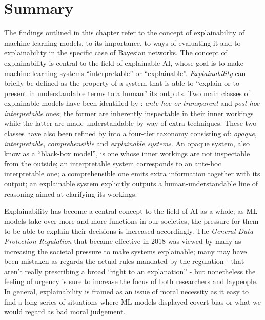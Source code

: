\section{Summary} \label{sec:literature-review-summary}
The findings outlined in this chapter refer to the concept of explainability of machine learning models, to its importance, to ways of evaluating it and to explainability in the specific case of Bayesian networks.
The concept of explainability is central to the field of explainable AI, whose goal is to make machine learning systems \enquote{interpretable} or \enquote{explainable}.
\textit{Explainability} can briefly be defined as the property of a system that is able to \enquote{explain or to present in understandable terms to a human} \citep{dosilovic2018} its outputs.
Two main classes of explainable models have been identified by \citet{mittelstadt2019explaining}: \textit{ante-hoc or transparent} and \textit{post-hoc interpretable} ones; the former are inherently inspectable in their inner workings while the latter are made understandable by way of extra techniques.
These two classes have also been refined by \citet{doshi2017towards} into a four-tier taxonomy consisting of: \textit{opaque}, \textit{interpretable}, \textit{comprehensible} and \textit{explainable systems}.
An opaque system, also know as a \enquote{black-box model}, is one whose inner workings are not inspectable from the outside; an interpretable system corresponds to an ante-hoc interpretable one; a comprehensible one emits extra information together with its output; an explainable system explicitly outputs a human-understandable line of reasoning aimed at clarifying its workings.

Explainability has become a central concept to the field of AI as a whole; as ML models take over more and more functions in our societies, the pressure for them to be able to explain their decisions is increased accordingly.
The \textit{General Data Protection Regulation} that became effective in 2018 was viewed by many as increasing the societal pressure to make systems explainable; many may have been mistaken as regards the actual rules mandated by the regulation - that aren't really prescribing a broad \enquote{right to an explanation} \citep{edwards2018enslaving} - but nonetheless the feeling of urgency is sure to increase the focus of both researchers and laypeople.
In general, explainability is framed as an issue of moral necessity as it easy to find a long series of situations where ML models displayed covert bias or what we would regard as bad moral judgement.


